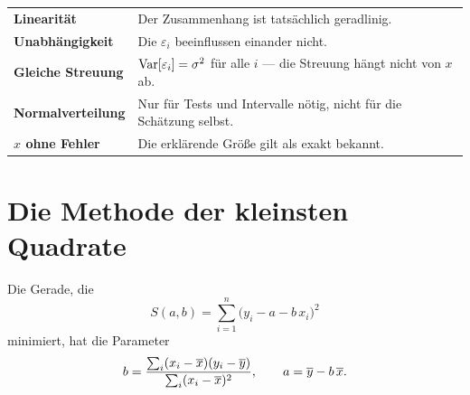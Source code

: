 \begin{merksatz}
\begin{center}
{\small
\renewcommand{\arraystretch}{1.52}
\begin{tabular}{@{}P{2.8cm}P{5.8cm}@{}}
\toprule
\textbf{Linearität} & Der Zusammenhang ist tatsächlich geradlinig.\\
\textbf{Unabhängig\-keit} & Die $\varepsilon_i$ beeinflussen einander nicht.\\
\textbf{Gleiche Streuung} & $\operatorname{Var}[\varepsilon_i] = \sigma^2$ für alle $i$ --- die Streuung hängt nicht von $x$ ab.\\
\textbf{Normal\-verteilung} & Nur für Tests und Intervalle nötig, nicht für die Schätzung selbst.\\
\textbf{$x$ ohne Fehler} & Die erklärende Größe gilt als exakt bekannt.\\
\bottomrule
\end{tabular}}
\end{center}

\begin{center}
\begin{minipage}{0.88\textwidth}
\end{minipage}
\end{center}
\end{merksatz}

\section{Die Methode der kleinsten Quadrate}

\begin{merksatz}
Die Gerade, die
\[ S(a,b) = \sum_{i=1}^n \bigl(y_i - a - b\,x_i\bigr)^2 \]
minimiert, hat die Parameter
\[ b = \frac{\sum_i (x_i-\overline{x})(y_i-\overline y)}{\sum_i (x_i-\overline{x})^2}, \qquad a = \overline y - b\,\overline{x} . \]
\end{merksatz}

